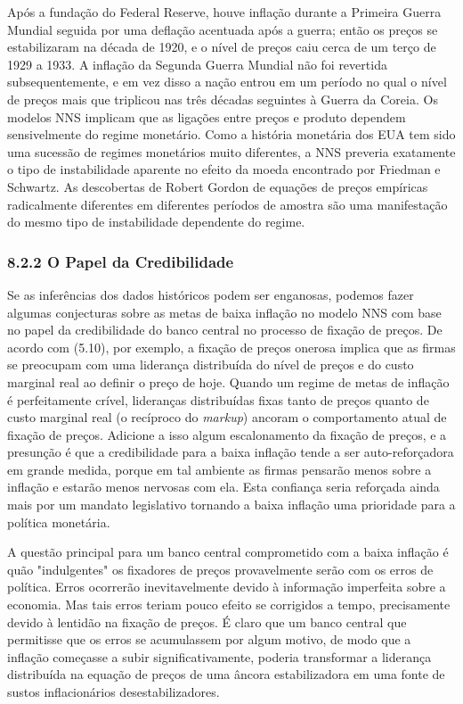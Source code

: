 \documentclass[12pt]{article}
\begin{document}
Após a fundação do Federal Reserve, houve inflação durante a Primeira Guerra Mundial seguida por uma deflação acentuada após a guerra; então os preços se estabilizaram na década de 1920, e o nível de preços caiu cerca de um terço de 1929 a 1933. A inflação da Segunda Guerra Mundial não foi revertida subsequentemente, e em vez disso a nação entrou em um período no qual o nível de preços mais que triplicou nas três décadas seguintes à Guerra da Coreia. Os modelos NNS implicam que as ligações entre preços e produto dependem sensivelmente do regime monetário. Como a história monetária dos EUA tem sido uma sucessão de regimes monetários muito diferentes, a NNS preveria exatamente o tipo de instabilidade aparente no efeito da moeda encontrado por Friedman e Schwartz. As descobertas de Robert Gordon de equações de preços empíricas radicalmente diferentes em diferentes períodos de amostra são uma manifestação do mesmo tipo de instabilidade dependente do regime.

\subsubsection{8.2.2 O Papel da Credibilidade} Se as inferências dos dados históricos podem ser enganosas, podemos fazer algumas conjecturas sobre as metas de baixa inflação no modelo NNS com base no papel da credibilidade do banco central no processo de fixação de preços. De acordo com (5.10), por exemplo, a fixação de preços onerosa implica que as firmas se preocupam com uma liderança distribuída do nível de preços e do custo marginal real ao definir o preço de hoje. Quando um regime de metas de inflação é perfeitamente crível, lideranças distribuídas fixas tanto de preços quanto de custo marginal real (o recíproco do \textit{markup}) ancoram o comportamento atual de fixação de preços. Adicione a isso algum escalonamento da fixação de preços, e a presunção é que a credibilidade para a baixa inflação tende a ser auto-reforçadora em grande medida, porque em tal ambiente as firmas pensarão menos sobre a inflação e estarão menos nervosas com ela. Esta confiança seria reforçada ainda mais por um mandato legislativo tornando a baixa inflação uma prioridade para a política monetária.

A questão principal para um banco central comprometido com a baixa inflação é quão "indulgentes" os fixadores de preços provavelmente serão com os erros de política. Erros ocorrerão inevitavelmente devido à informação imperfeita sobre a economia. Mas tais erros teriam pouco efeito se corrigidos a tempo, precisamente devido à lentidão na fixação de preços. É claro que um banco central que permitisse que os erros se acumulassem por algum motivo, de modo que a inflação começasse a subir significativamente, poderia transformar a liderança distribuída na equação de preços de uma âncora estabilizadora em uma fonte de sustos inflacionários desestabilizadores.
\end{document}

